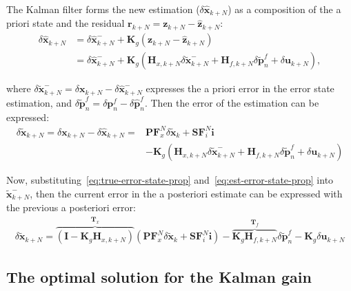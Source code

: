 The Kalman filter forms the new estimation ($\delta\hat{\mathbf{x}}_{k+N}$) as a composition of the a priori state and the residual $\mathbf{r}_{k+N}=\mathbf{z}_{k+N}-\hat{\mathbf{z}}_{k+N}$:
\begin{equation}
\begin{aligned}
    \delta\hat{\mathbf{x}}_{k+N} &= \delta\hat{\mathbf{x}}_{k+N}^-+\mathbf{K}_g(\mathbf{z}_{k+N}-\hat{\mathbf{z}}_{k+N}) \\ &=
    \delta\hat{\mathbf{x}}_{k+N}^-+\mathbf{K}_g(\mathbf{H}_{x,k+N}\delta\tilde{\mathbf{x}}_{k+N}^-+\mathbf{H}_{f, k+N}\delta\tilde{\mathbf{p}}_{n}^f + \delta\mathbf{u}_{k+N}),
\end{aligned}
\end{equation}

where $\delta\tilde{\mathbf{x}}_{k+N}^-=\delta\mathbf{x}_{k+N}-\delta\hat{\mathbf{x}}_{k+N}^-$ expresses the a priori error in the error state estimation, and $\delta\tilde{\mathbf{p}}_{n}^f=\delta\mathbf{p}_{n}^f-\delta\hat{\mathbf{p}}_{n}^f$. Then the error of the estimation can be expressed:
\begin{equation}
\begin{aligned}
    \delta\tilde{\mathbf{x}}_{k+N} = \delta\mathbf{x}_{k+N}-\delta\hat{\mathbf{x}}_{k+N} =&
    \mathbf{PF}_x^N\delta\tilde{\mathbf{x}}_{k} + \mathbf{SF}_i^N\mathbf{i} \\ &-\mathbf{K}_g(\mathbf{H}_{x,k+N}\delta \tilde{\mathbf{x}}_{k+N}^- +
    \mathbf{H}_{f,k+N}\delta \tilde{\mathbf{p}}_{n}^f + \delta\mathbf{u}_{k+N})
\end{aligned}
\end{equation}
    
Now, substituting~\eqref{eq:true-error-state-prop} and~\eqref{eq:est-error-state-prop} into $\tilde{\mathbf{x}}_{k+N}^-$, then the current error in the a posteriori estimate can be expressed with the previous a posteriori error:
\begin{equation}
\begin{aligned}
    \delta\tilde{\mathbf{x}}_{k+N} = \overbrace{(\mathbf{I}-\mathbf{K}_g\mathbf{H}_{x,k+N})}^{\mathbf{T}_x}\left(\mathbf{PF}_x^N\delta\tilde{\mathbf{x}}_{k}+ \mathbf{SF}_i^N \mathbf{i}\right) -\overbrace{\mathbf{K}_g\mathbf{H}_{f,k+N}}^{\mathbf{T}_f}\delta \tilde{\mathbf{p}}_{n}^f - \mathbf{K}_g\delta\mathbf{u}_{k+N}
\end{aligned}
\end{equation}

\subsection{The optimal solution for the Kalman gain}

